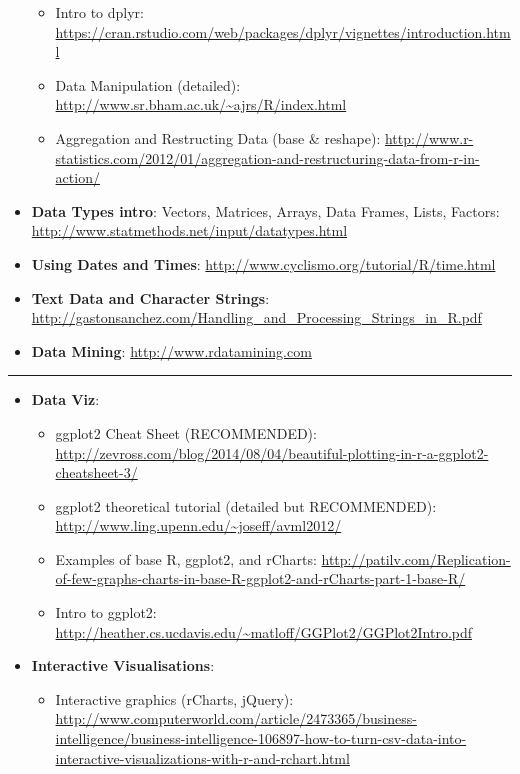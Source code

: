 \documentclass[]{book}
\providecommand{\tightlist}{%
  \setlength{\itemsep}{0pt}\setlength{\parskip}{0pt}}
\begin{document}
\begin{itemize}
  \begin{itemize}
  \tightlist
  \item
    Intro to dplyr: \url{https://cran.rstudio.com/web/packages/dplyr/vignettes/introduction.html}
  \item
    Data Manipulation (detailed): \url{http://www.sr.bham.ac.uk/~ajrs/R/index.html}
  \item
    Aggregation and Restructing Data (base \& reshape): \url{http://www.r-statistics.com/2012/01/aggregation-and-restructuring-data-from-r-in-action/}
  \end{itemize}
\item
  \textbf{Data Types intro}: Vectors, Matrices, Arrays, Data Frames, Lists, Factors: \url{http://www.statmethods.net/input/datatypes.html}
\item
  \textbf{Using Dates and Times}: \url{http://www.cyclismo.org/tutorial/R/time.html}
\item
  \textbf{Text Data and Character Strings}: \url{http://gastonsanchez.com/Handling_and_Processing_Strings_in_R.pdf}
\item
  \textbf{Data Mining}: \url{http://www.rdatamining.com}
\end{itemize}

\begin{center}\rule{0.5\linewidth}{0.5pt}\end{center}

\begin{itemize}
\tightlist
\item
  \textbf{Data Viz}:

  \begin{itemize}
  \tightlist
  \item
    ggplot2 Cheat Sheet (RECOMMENDED): \url{http://zevross.com/blog/2014/08/04/beautiful-plotting-in-r-a-ggplot2-cheatsheet-3/}
  \item
    ggplot2 theoretical tutorial (detailed but RECOMMENDED): \url{http://www.ling.upenn.edu/~joseff/avml2012/}
  \item
    Examples of base R, ggplot2, and rCharts: \url{http://patilv.com/Replication-of-few-graphs-charts-in-base-R-ggplot2-and-rCharts-part-1-base-R/}
  \item
    Intro to ggplot2: \url{http://heather.cs.ucdavis.edu/~matloff/GGPlot2/GGPlot2Intro.pdf}
  \end{itemize}
\item
  \textbf{Interactive Visualisations}:

  \begin{itemize}
  \tightlist
  \item
    Interactive graphics (rCharts, jQuery): \url{http://www.computerworld.com/article/2473365/business-intelligence/business-intelligence-106897-how-to-turn-csv-data-into-interactive-visualizations-with-r-and-rchart.html}
  \end{itemize}
\end{itemize}
\end{document}
